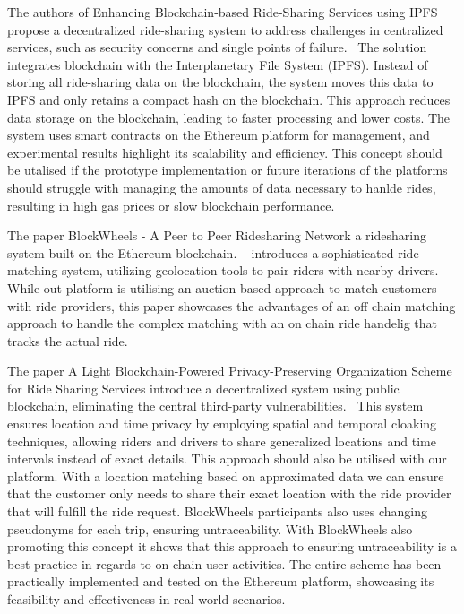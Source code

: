 The authors of Enhancing Blockchain-based Ride-Sharing Services using IPFS  propose a decentralized ride-sharing system to address challenges in centralized services, such as security concerns and single points of failure.~\cite{Mahmoud.2022}  The solution integrates blockchain with the Interplanetary File System (IPFS). Instead of storing all ride-sharing data on the blockchain, the system moves this data to IPFS and only retains a compact hash on the blockchain. This approach reduces data storage on the blockchain, leading to faster processing and lower costs. The system uses smart contracts on the Ethereum platform for management, and experimental results highlight its scalability and efficiency. This concept should be utalised if the prototype implementation or future iterations of the platforms should struggle with managing the amounts of data necessary to hanlde rides, resulting in high gas prices or slow blockchain performance.


The paper BlockWheels - A Peer to Peer Ridesharing Network a ridesharing system built on the Ethereum blockchain. ~\cite{Joseph.} introduces a sophisticated ride-matching system, utilizing geolocation tools to pair riders with nearby drivers. While out platform is utilising an auction based approach to match customers with ride providers, this paper showcases the advantages of an off chain matching approach to handle the complex matching with an on chain ride handelig that tracks the actual ride.

The paper A Light Blockchain-Powered Privacy-Preserving Organization Scheme for Ride Sharing Services introduce a decentralized system using public blockchain, eliminating the central third-party vulnerabilities.~\cite{Baza.52520205282020} This system ensures location and time privacy by employing spatial and temporal cloaking techniques, allowing riders and drivers to share generalized locations and time intervals instead of exact details. This approach should also be utilised with our platform. With a location matching based on approximated data we can ensure that the customer only needs to share their exact location with the ride provider that will fulfill the ride request.
 BlockWheels participants also uses changing pseudonyms for each trip, ensuring untraceability. With BlockWheels also promoting this concept it shows that this approach to ensuring untraceability is a best practice in regards to on chain user activities. The entire scheme has been practically implemented and tested on the Ethereum platform, showcasing its feasibility and effectiveness in real-world scenarios.

